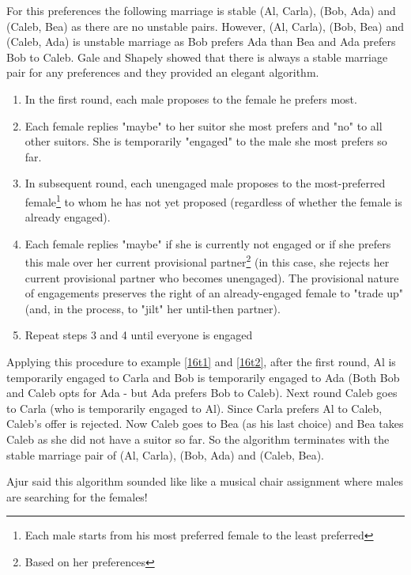 For this preferences the following marriage is stable (Al, Carla), (Bob, Ada) and (Caleb, Bea) as there are no unstable pairs.
However, (Al, Carla), (Bob, Bea) and (Caleb, Ada) is unstable marriage as Bob prefers Ada than Bea and Ada prefers Bob to Caleb.
Gale and Shapely showed that there is always a stable marriage pair for any preferences and they provided an elegant algorithm.

\begin{enumerate}
    \item In the first round, each male proposes to the female he prefers most.
    \item Each female replies "maybe" to her suitor she most prefers and "no" to all other suitors. She is temporarily "engaged" to the male she most prefers so far. 
    \item In subsequent round, each unengaged male proposes to the most-preferred female\footnote{Each male starts from his most preferred female to the least preferred} to whom he has not yet proposed (regardless of whether the female is already engaged).
    \item Each female replies "maybe" if she is currently not engaged or if she prefers this male over her current provisional partner\footnote{Based on her preferences} (in this case, she rejects her current provisional partner who becomes unengaged). The provisional nature of engagements preserves the right of an already-engaged female to "trade up" (and, in the process, to "jilt" her until-then partner).
   \item Repeat steps 3 and 4 until everyone is engaged
\end{enumerate}

Applying this procedure to example \ref{16t1} and \ref{16t2}, after the first round, Al is temporarily engaged to Carla and Bob is temporarily engaged to Ada (Both Bob and Caleb opts for Ada - but Ada prefers Bob to Caleb). Next round Caleb goes to Carla (who is temporarily engaged to Al). Since Carla prefers Al to Caleb, Caleb's offer is rejected. Now Caleb goes to Bea (as his last choice) and Bea takes Caleb as she did not have a suitor so far. So the algorithm terminates with the stable marriage pair of (Al, Carla), (Bob, Ada) and (Caleb, Bea). 

Ajur said this algorithm sounded like like a musical chair assignment where males are searching for the females!

